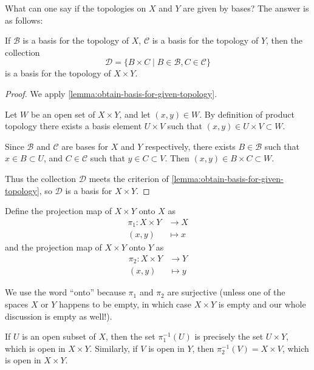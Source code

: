 What can one say if the topologies on $X$ and $Y$ are given by bases? The answer is as follows:

\begin{lemma}
If $\mathcal{B}$ is a basis for the topology of $X$, $\mathcal{C}$ is a basis for the topology of $Y$, then the collection
\[\mathcal{D}=\{B\times C\mid B\in\mathcal{B}, C\in\mathcal{C}\}\]
is a basis for the topology of $X\times Y$.
\end{lemma}

\begin{proof}
We apply \ref{lemma:obtain-basis-for-given-topology}.

Let $W$ be an open set of $X\times Y$, and let $(x,y)\in W$. By definition of product topology there exists a basis element $U\times V$ such that $(x,y)\in U\times V\subset W$. 

Since $\mathcal{B}$ and $\mathcal{C}$ are bases for $X$ and $Y$ respectively, there exists $B\in\mathcal{B}$ such that $x\in B\subset U$, and $C\in\mathcal{C}$ such that $y\in C\subset V$. Then $(x,y)\in B\times C\subset W$. 

Thus the collection $\mathcal{D}$ meets the criterion of \ref{lemma:obtain-basis-for-given-topology}, so $\mathcal{D}$ is a basis for $X\times Y$.
\end{proof}

\begin{definition}
Define the projection map of $X\times Y$ onto $X$ as
\begin{align*}
\pi_1\colon X\times Y&\to X\\
(x,y)&\mapsto x
\end{align*}
and the projection map of $X\times Y$ onto $Y$ as
\begin{align*}
\pi_2\colon X\times Y&\to Y\\
(x,y)&\mapsto y
\end{align*}
\end{definition}

\begin{remark}
We use the word ``onto'' because $\pi_1$ and $\pi_2$ are surjective (unless one of the spaces $X$ or $Y$ happens to be empty, in which case $X\times Y$ is empty and our whole discussion is empty as well!).
\end{remark}

If $U$ is an open subset of $X$, then the set $\pi_1^{-1}(U)$ is precisely the set $U\times Y$, which is open in $X\times Y$.
Similarly, if $V$ is open in $Y$, then $\pi_2^{-1}(V)=X\times V$, which is open in $X\times Y$.

